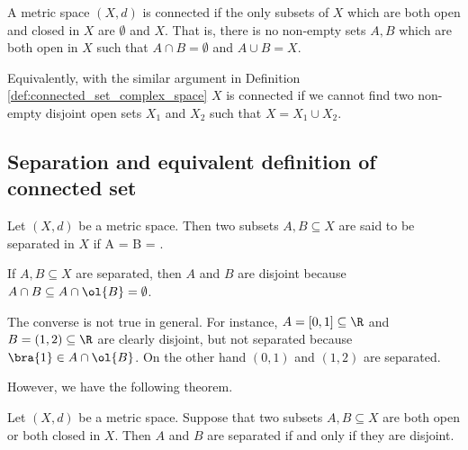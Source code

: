 \begin{definition}\label{def:connected_set_metric}
A metric space $(X,d)$ is connected if the only subsets of $X$ which are both open and closed in $X$ are $\emptyset$ and $X$. That is, there is no non-empty sets $A,B$ which are both open in $X$ such that $A\cap B = \emptyset$ and $A\cup B = X$.
\end{definition}

\begin{remark}
Equivalently, with the similar argument in Definition \ref{def:connected_set_complex_space} $X$ is connected if we cannot find two non-empty disjoint open sets $X_1$ and $X_2$ such that $X = X_1\cup X_2$. 
\end{remark}



\subsection{Separation and equivalent definition of connected set}

\begin{definition}
Let $(X,d)$ be a metric space. Then two subsets $A,B\subseteq X$ are said to be separated in $X$ if
\be
A\cap {} =  \cap B = \emptyset.
\ee
\end{definition}

\begin{remark}
If $A,B\subseteq X$ are separated, then $A$ and $B$ are disjoint because $A\cap B \subseteq A \cap \ol{B} = \emptyset$.
\end{remark}

\begin{example}
The converse is not true in general. For instance, $A = [0,1]\subseteq \R$ and $B = (1,2)\subseteq \R$ are clearly disjoint, but not separated because $\bra{1}\in A\cap \ol{B}$. On the other hand $(0,1)$ and $(1,2)$ are separated.
\end{example}

However, we have the following theorem.

\begin{theorem}\label{thm:subsets_both_open_closed_are_separated_iff_disjoint_metric}
Let $(X,d)$ be a metric space. Suppose that two subsets $A,B\subseteq X$ are both open or both closed in $X$. Then $A$ and $B$ are separated if and only if they are disjoint.
\end{theorem}

